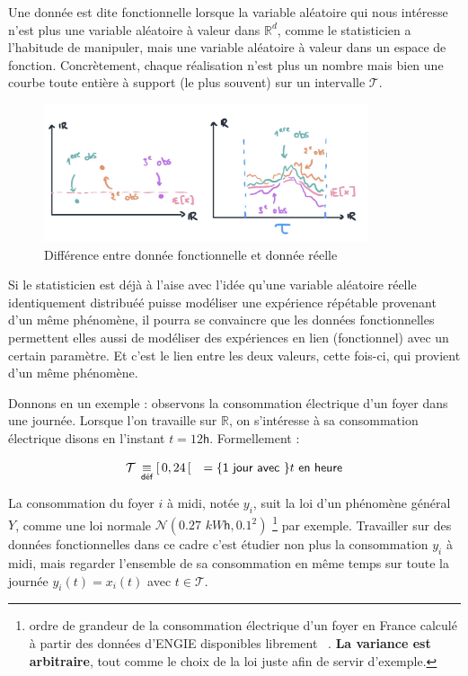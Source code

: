 
Une donnée est dite fonctionnelle lorsque la variable aléatoire qui nous intéresse n'est plus une variable aléatoire à valeur dans $\mathds R^d$, comme le statisticien a l'habitude de manipuler, mais une variable aléatoire à valeur dans un espace de fonction. Concrètement, chaque réalisation n'est plus un nombre mais bien une courbe toute entière à support (le plus souvent) sur un intervalle $\mathcal T$.

\begin{figure}[H]
	\centering
	\includegraphics[width=0.85\textwidth]{Images/motivation/donneesRvsFD.jpg}
	\caption{Différence entre donnée fonctionnelle et donnée réelle}
	\label{img:RvsFD}
\end{figure}

Si le statisticien est déjà à l'aise avec l'idée qu'une variable aléatoire réelle identiquement distribuéé puisse modéliser une expérience répétable provenant d'un même phénomène, il pourra se convaincre que les données fonctionnelles permettent elles aussi de modéliser des expériences en lien (fonctionnel) avec un certain paramètre. Et c'est le lien entre les deux valeurs, cette fois-ci, qui provient d'un même phénomène.

\bigskip

Donnons en un exemple : observons la consommation électrique d'un foyer dans une journée. Lorsque l'on travaille sur $\mathds R$, on s'intéresse à sa consommation électrique disons en l'instant $t = 12\mathsf{h}$. Formellement :

\begin{equation*}
	\mathcal T \, \isdef [\, 0,24 \,[ \quad = \{\textsf{1 jour avec }\} t \textsf{ en heure}
\end{equation*}

La consommation du foyer $i$ à midi, notée $y_i$, suit la loi d'un phénomène général $Y$, comme une loi normale $\mathcal N\left( 0.27 \, \, kW\mathsf h, 0.1^2 \right)$
%
\footnote{ ordre de grandeur de la consommation électrique d'un foyer en France calculé à partir des données d'ENGIE disponibles librement ~\cite{engie-data-conso-moy-par-an}. \textbf{La variance est arbitraire}, tout comme le choix de la loi juste afin de servir d'exemple. }
%
par exemple. Travailler sur des données fonctionnelles dans ce cadre c'est étudier non plus la consommation $y_i$ à midi, mais regarder l'ensemble de sa consommation en même temps sur toute la journée $y_i(t) = x_i(t)$ avec $t \in \mathcal T$.

